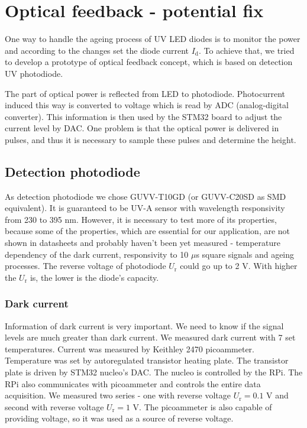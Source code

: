 \section{Optical feedback - potential fix}
One way to handle the ageing process of UV LED diodes is to monitor the power and according to the changes set the diode current $I_\textrm{d}$. To achieve that, we tried to develop a prototype of optical feedback concept, which is based on detection UV photodiode. 
\par
The part of optical power is reflected from LED to photodiode. Photocurrent induced this way is converted to voltage which is read by ADC (analog-digital converter). This information is then used by the STM32 board to adjust the current level by DAC. One problem is that the optical power is delivered in pulses, and thus it is necessary to sample these pulses and determine the height.
\par
\subsection{Detection photodiode}
As detection photodiode we chose GUVV-T10GD (or GUVV-C20SD as SMD equivalent). It is guaranteed to be UV-A sensor with wavelength responsivity from 230 to 395 nm. However, it is necessary to test more of its properties, because some of the properties, which are essential for our application, are not shown in datasheets and probably haven't been yet measured - temperature dependency of the dark current, responsivity to 10 $\mu$s square signals and ageing processes. The reverse voltage of photodiode $U_\textrm{r}$ could go up to 2 V. With higher the $U_\textrm{r}$ is, the lower is the diode's capacity.
\par
\subsubsection{Dark current}
Information of dark current is very important. We need to know if the signal levels are much greater than dark current. We measured dark current with 7 set temperatures. Current was measured by Keithley 2470 picoammeter. Temperature was set by autoregulated transistor heating plate. The transistor plate is driven by STM32 nucleo's DAC. The nucleo is controlled by the RPi. The RPi also communicates with picoammeter and controls the entire data acquisition. We measured two series - one with reverse voltage $U_\textrm{r} = 0.1$ V and second with reverse voltage $U_\textrm{r} = 1$ V. The picoammeter is also capable of providing voltage, so it was used as a source of reverse voltage.

